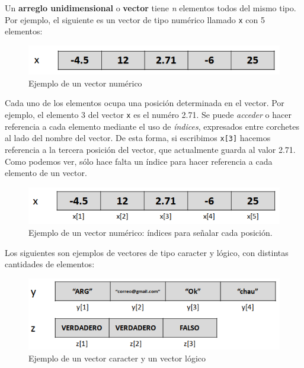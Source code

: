 \documentclass[
]{book}
\begin{document}
Un \textbf{arreglo unidimensional} o \textbf{vector} tiene \emph{n} elementos todos del mismo tipo. Por ejemplo, el siguiente es un vector de tipo numérico llamado \texttt{x} con 5 elementos:

\begin{figure}

{\centering \includegraphics[width=0.6\linewidth]{images/05_estructuras/estr01} 

}

\caption{Ejemplo de un vector numérico}\label{fig:unnamed-chunk-100}
\end{figure}

Cada uno de los elementos ocupa una posición determinada en el vector. Por ejemplo, el elemento 3 del vector \texttt{x} es el numéro 2.71. Se puede \emph{acceder} o hacer referencia a cada elemento mediante el uso de \emph{índices}, expresados entre corchetes al lado del nombre del vector. De esta forma, si escribimos \texttt{x{[}3{]}} hacemos referencia a la tercera posición del vector, que actualmente guarda al valor 2.71. Como podemos ver, sólo hace falta un índice para hacer referencia a cada elemento de un vector.

\begin{figure}

{\centering \includegraphics[width=0.6\linewidth]{images/05_estructuras/estr02} 

}

\caption{Ejemplo de un vector numérico: índices para señalar cada posición.}\label{fig:unnamed-chunk-101}
\end{figure}

Los siguientes son ejemplos de vectores de tipo caracter y lógico, con distintas cantidades de elementos:

\begin{figure}

{\centering \includegraphics[width=0.6\linewidth]{images/05_estructuras/estr03} 

}

\caption{Ejemplo de un vector caracter y un vector lógico}\label{fig:unnamed-chunk-102}
\end{figure}
\end{document}
